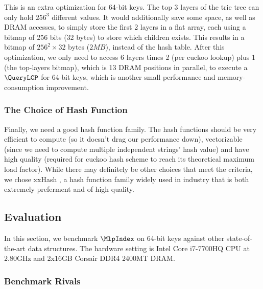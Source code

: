 \documentclass[11pt, usletter]{article}
\begin{document}
This is an extra optimization for 64-bit keys.
The top 3 layers of the trie tree can only hold $256^3$ different values. 
It would additionally save some space, as well as DRAM accesses, to simply store the first 2 layers
in a flat array, each using a bitmap of 256 bits (32 bytes) to store which children exists. 
This results in a bitmap of $256^2\times 32$ bytes ($2MB$), instead of the hash table. 
After this optimization, we only need to access 6 layers times 2 (per cuckoo lookup) plus 1 (the top-layers bitmap), 
which is 13 DRAM positions in parallel, to execute a $\QueryLCP$ for 64-bit keys, 
which is another small performance and memory-consumption improvement.
 
\subsubsection*{The Choice of Hash Function}

Finally, we need a good hash function family.
The hash functions should be very efficient to compute (so it doesn't drag our performance down), 
vectorizable (since we need to compute multiple independent strings' hash value) 
and have high quality (required for cuckoo hash scheme to reach its theoretical maximum load factor).
While there may definitely be other choices that meet the criteria, 
we chose xxHash \cite{xxhash}, 
a hash function family widely used in industry that is both extremely preferment and of high quality.

\subsection{Evaluation} \label{mlpindex_eval}

In this section, we benchmark $\MlpIndex$ on 64-bit keys against other state-of-the-art data structures. 
The hardware setting is Intel Core i7-7700HQ CPU at 2.80GHz and 2x16GB Corsair DDR4 2400MT DRAM.

\subsubsection*{Benchmark Rivals}
\end{document}
